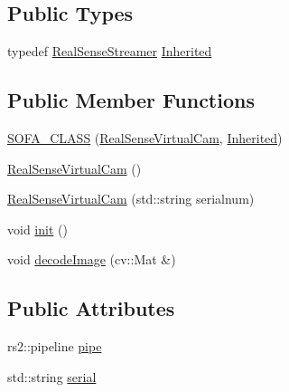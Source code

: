 \subsection*{Public Types}
\begin{DoxyCompactItemize}
\item 
typedef \hyperlink{classsofa_1_1rgbdtracking_1_1_real_sense_streamer}{Real\+Sense\+Streamer} \hyperlink{classsofa_1_1rgbdtracking_1_1_real_sense_virtual_cam_aaf38bfd843842903f4b1e4457af3240f}{Inherited}
\end{DoxyCompactItemize}
\subsection*{Public Member Functions}
\begin{DoxyCompactItemize}
\item 
\hyperlink{classsofa_1_1rgbdtracking_1_1_real_sense_virtual_cam_ac20d0286ccdd5caff30412db342814dc}{S\+O\+F\+A\+\_\+\+C\+L\+A\+SS} (\hyperlink{classsofa_1_1rgbdtracking_1_1_real_sense_virtual_cam}{Real\+Sense\+Virtual\+Cam}, \hyperlink{classsofa_1_1rgbdtracking_1_1_real_sense_virtual_cam_aaf38bfd843842903f4b1e4457af3240f}{Inherited})
\item 
\hyperlink{classsofa_1_1rgbdtracking_1_1_real_sense_virtual_cam_a446fade9737c58e32cacdfe3e7edcb2a}{Real\+Sense\+Virtual\+Cam} ()
\item 
\hyperlink{classsofa_1_1rgbdtracking_1_1_real_sense_virtual_cam_a673da2cd1e90f9448b458066e2f81eee}{Real\+Sense\+Virtual\+Cam} (std\+::string serialnum)
\item 
void \hyperlink{classsofa_1_1rgbdtracking_1_1_real_sense_virtual_cam_adc341623bbde6d3cc70f2cdc8a0263ef}{init} ()
\item 
void \hyperlink{classsofa_1_1rgbdtracking_1_1_real_sense_virtual_cam_a09165a2c712fb5fd2f81f9fadaaedf7b}{decode\+Image} (cv\+::\+Mat \&)
\end{DoxyCompactItemize}
\subsection*{Public Attributes}
\begin{DoxyCompactItemize}
\item 
rs2\+::pipeline \hyperlink{classsofa_1_1rgbdtracking_1_1_real_sense_virtual_cam_aebfd00b71c1ce8a5505a602386dd3864}{pipe}
\item 
std\+::string \hyperlink{classsofa_1_1rgbdtracking_1_1_real_sense_virtual_cam_a45ccc29bedb1dd6f5357a0a3ecb8f8bb}{serial}
\end{DoxyCompactItemize}
